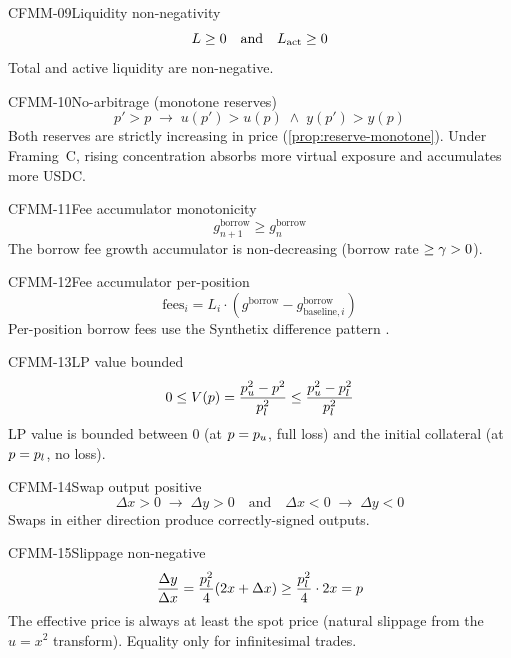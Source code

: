 \begin{invariant}{CFMM-09}{Liquidity non-negativity}
\[
  L \geq 0 \quad\text{and}\quad L_{\text{act}} \geq 0
\]
Total and active liquidity are non-negative.
\end{invariant}

\begin{invariant}{CFMM-10}{No-arbitrage (monotone reserves)}
\[
  p' > p \;\longrightarrow\; u(p') > u(p) \;\land\; y(p') > y(p)
\]
Both reserves are strictly increasing in price (\cref{prop:reserve-monotone}).
Under Framing~C, rising concentration absorbs more virtual exposure and
accumulates more USDC.
\end{invariant}

\begin{invariant}{CFMM-11}{Fee accumulator monotonicity}
\[
  g^{\text{borrow}}_{n+1} \geq g^{\text{borrow}}_n
\]
The borrow fee growth accumulator is non-decreasing (borrow rate $\geq \gamma > 0$).
\end{invariant}

\begin{invariant}{CFMM-12}{Fee accumulator per-position}
\[
  \text{fees}_i = L_i \cdot (g^{\text{borrow}} - g^{\text{borrow}}_{\text{baseline},i})
\]
Per-position borrow fees use the Synthetix difference pattern \cite{batog2018scalable}.
\end{invariant}

\begin{invariant}{CFMM-13}{LP value bounded}
\[
  0 \leq V(p) = \frac{p_u^2 - p^2}{p_l^2} \leq \frac{p_u^2 - p_l^2}{p_l^2}
\]
LP value is bounded between 0 (at $p = p_u$, full loss) and the initial
collateral (at $p = p_l$, no loss).
\end{invariant}

\begin{invariant}{CFMM-14}{Swap output positive}
\[
  \Delta x > 0 \;\longrightarrow\; \Delta y > 0
  \quad\text{and}\quad
  \Delta x < 0 \;\longrightarrow\; \Delta y < 0
\]
Swaps in either direction produce correctly-signed outputs.
\end{invariant}

\begin{invariant}{CFMM-15}{Slippage non-negative}
\[
  \frac{\Delta y}{\Delta x} = \frac{p_l^2}{4}(2x + \Delta x) \geq \frac{p_l^2}{4} \cdot 2x = p
\]
The effective price is always at least the spot price (natural slippage from
the $u = x^2$ transform). Equality only for infinitesimal trades.
\end{invariant}


